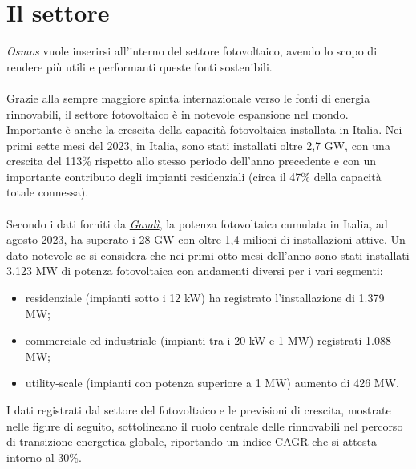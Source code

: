 \documentclass[a4paper, 12pt]{article}
\begin{document}
	\section{Il settore}
	\emph{Osmos} vuole inserirsi all'interno del settore fotovoltaico, avendo lo scopo di rendere più utili e performanti queste fonti sostenibili.\\\\
	Grazie alla sempre maggiore spinta internazionale verso le fonti di energia rinnovabili, il settore fotovoltaico è in notevole espansione nel mondo.\\
	Importante è anche la crescita della capacità fotovoltaica installata in Italia. Nei primi sette mesi del 2023, in Italia, sono stati installati oltre 2,7 GW, con una crescita del 113\% rispetto allo stesso periodo dell'anno precedente e con un importante contributo degli impianti residenziali (circa il 47\% della capacità totale connessa).\\\\
	Secondo i dati forniti da \href{https://www.terna.it/it/sistema-elettrico/dispacciamento/fonti-rinnovabili}{\emph{Gaudì}}, la potenza fotovoltaica cumulata in Italia, ad agosto 2023, ha superato i 28 GW con oltre 1,4 milioni di installazioni attive. Un dato notevole se si considera che nei primi otto mesi dell'anno sono stati installati 3.123 MW di potenza fotovoltaica con andamenti diversi per i vari segmenti:
	\begin{itemize}
		\item residenziale (impianti sotto i 12 kW) ha registrato l'installazione di 1.379 MW;
		\item commerciale ed industriale (impianti tra i 20 kW e 1 MW) registrati 1.088 MW;
		\item utility-scale (impianti con potenza superiore a 1 MW) aumento di 426 MW.
	\end{itemize}
	I dati registrati dal settore del fotovoltaico e le previsioni di crescita, mostrate nelle figure di seguito, sottolineano il ruolo centrale delle rinnovabili nel percorso di transizione energetica globale, riportando un indice CAGR che si attesta intorno al 30\%.
\end{document}
